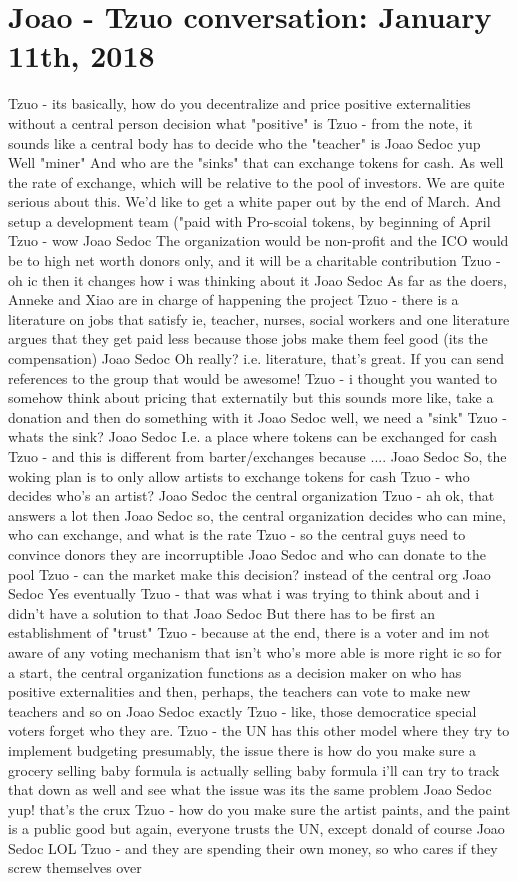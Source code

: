 \section{Joao - Tzuo conversation: January 11th, 2018}


Tzuo -
its basically, how do you decentralize and price positive externalities without a central person decision what "positive" is
Tzuo -
from the note, it sounds like a central body has to decide who the "teacher" is
Joao Sedoc
yup
Well "miner"
And who are the "sinks" that can exchange tokens for cash.
As well the rate of exchange, which will be relative to the pool of investors.
We are quite serious about this.
We'd like to get a white paper out by the end of March.
And setup a development team ("paid with Pro-scoial tokens, by beginning of April
Tzuo -
wow
Joao Sedoc
The organization would be non-profit and the ICO would be to high net worth donors only, and it will be a charitable contribution
Tzuo -
oh ic
then it changes how i was thinking about it
Joao Sedoc
As far as the doers, Anneke and Xiao are in charge of happening the project
Tzuo -
there is a literature on jobs that satisfy ie, teacher, nurses, social workers
and one literature argues that they get paid less
because those jobs make them feel good (its the compensation)
Joao Sedoc
Oh really? i.e. literature, that's great.
If you can send references to the group that would be awesome!
Tzuo -
i thought you wanted to somehow think about pricing that externatily
but this sounds more like, take a donation and then do something with it
Joao Sedoc
well, we need a "sink"
Tzuo -
whats the sink?
Joao Sedoc
I.e. a place where tokens can be exchanged for cash
Tzuo -
and this is different from barter/exchanges because ....
Joao Sedoc
So, the woking plan is to only allow artists to exchange tokens for cash
Tzuo -
who decides who's an artist?
Joao Sedoc
the central organization
Tzuo -
ah
ok, that answers a lot then
Joao Sedoc
so, the central organization decides who can mine, who can exchange, and what is the rate
Tzuo -
so the central guys need to convince donors they are incorruptible
Joao Sedoc
and who can donate to the pool
Tzuo -
can the market make this decision?
instead of the central org
Joao Sedoc
Yes eventually
Tzuo -
that was what i was trying to think about and i didn't have a solution to that
Joao Sedoc
But there has to be first an establishment of "trust"
Tzuo -
because at the end, there is a voter and im not aware of any voting mechanism that isn't who's more able is more right
ic
so for a start, the central organization functions as a decision maker on who has positive externalities
and then, perhaps, the teachers can vote to make new teachers and so on
Joao Sedoc
exactly
Tzuo -
like, those democratice special voters
forget who they are.
Tzuo -
the UN has this other model where they try to implement budgeting
presumably, the issue there is how do you make sure a grocery selling baby formula is actually selling baby formula
i'll can try to track that down as well and see what the issue was
its the same problem
Joao Sedoc
yup! that's the crux
Tzuo -
how do you make sure the artist paints, and the paint is a public good
but again, everyone trusts the UN, except donald of course
Joao Sedoc
LOL
Tzuo -
and they are spending their own money, so who cares if they screw themselves over